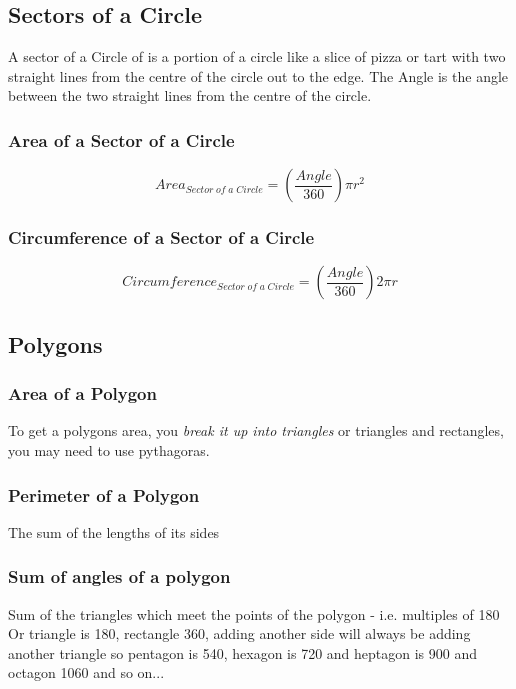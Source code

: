 \documentclass{article}
\begin{document}
\subsection{Sectors of a Circle}
A sector of a Circle of is a portion of a circle like a slice of pizza or tart with two straight lines from the centre of the circle out to the edge. The Angle is the angle between the two straight lines from the centre of the circle.
\subsubsection{Area of a Sector of a Circle}
\begin{equation}
Area_{ Sector\;of\;a\;Circle} = ( \frac{Angle }{ 360 }) \pi r^ 2
\end{equation}


\subsubsection{Circumference of a Sector of a Circle}
\begin{equation}
Circumference_{ Sector\;of\;a\;Circle} = ( \frac{Angle }{ 360} ) 2 \pi r
\end{equation}

\subsection{Polygons}
\subsubsection{Area of a Polygon}
To get a polygons area, you \textit{break it up into triangles} or triangles and rectangles, you may need to use pythagoras.
\subsubsection{Perimeter of a Polygon}
The sum of the lengths of its sides
\subsubsection{Sum of angles of a polygon}
Sum of the triangles which meet the points of the polygon - i.e. multiples of 180
Or triangle is 180, rectangle 360, adding another side will always be adding another triangle so
pentagon is 540, hexagon is 720 and heptagon is 900 and octagon 1060 and so on...
\end{document}
